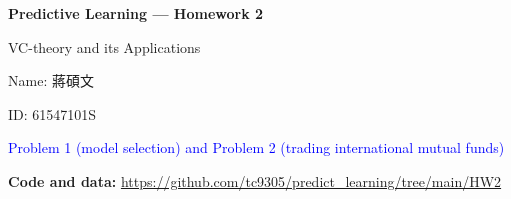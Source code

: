 \documentclass[11pt,a4paper]{article}
\begin{document}
{\LARGE\bfseries\color{navy} Predictive Learning --- Homework 2}\par
{\Large VC-theory and its Applications}\par
Name: 蔣碩文\par
ID: 61547101S\par
\textcolor{blue}{Problem 1 (model selection) and Problem 2 (trading international mutual funds)}
\par\textbf{Code and data:} \url{https://github.com/tc9305/predict_learning/tree/main/HW2}





\clearpage

\end{document}
